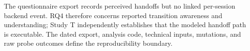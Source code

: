 The questionnaire export records perceived handoffs but no linked per-session
backend event.  RQ4 therefore concerns reported transition awareness and
understanding; Study T independently establishes that the modeled handoff path
is executable.  The dated export, analysis code, technical inputs, mutations,
and raw probe outcomes define the reproducibility boundary.
